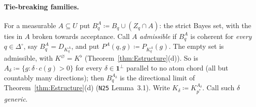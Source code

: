 \documentclass[11pt]{article}
\theoremstyle{definition}
\theoremstyle{remark}
\newcommand{\one}{\mathbf 1}
\newcommand{\Di}{\Delta^{\circ}}
\newcommand{\src}[1]{\texttt{#1}}
\begin{document}
\paragraph{Tie-breaking families.} For a measurable $A\subseteq U$ put $B^A_q\coloneqq B_q\cup(Z_q\cap A)$: the strict Bayes set, with the ties in $A$ broken towards acceptance. Call $A$ \emph{admissible} if $B^A_q$ is coherent for \emph{every} $q\in\Di$, say $B^A_q=D_{K^A_q}$, and put $P^A(q,g)\coloneqq P_{K^A_q}(g)$. The empty set is admissible, with $K^\varnothing=K^\flat$ (Theorem~\ref{thm:Estructure}(d)). So is $A_\delta\coloneqq\{g:\delta\cdot c(g)>0\}$ for every $\delta\in\one^\perp$ parallel to no atom chord (all but countably many directions); then $B^{A_\delta}_q$ is the directional limit of Theorem~\ref{thm:Estructure}(d) (\src{N25} Lemma~3.1). Write $K_\delta\coloneqq K^{A_\delta}_{p^*}$. Call such $\delta$ \emph{generic}.
\end{document}
